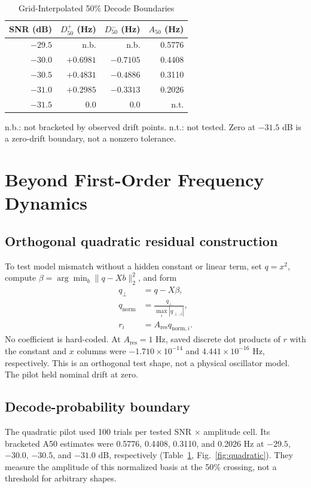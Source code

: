 \documentclass[conference]{IEEEtran}
\begin{document}
\begin{table}[t]
\caption{Grid-Interpolated 50\% Decode Boundaries}
\label{tab:boundaries}
\centering\footnotesize
\begin{tabular}{rrrr}
\toprule
SNR (dB) & $D_{50}^{+}$ (Hz) & $D_{50}^{-}$ (Hz) & $A_{50}$ (Hz) \\
\midrule
$-29.5$ & n.b. & n.b. & 0.5776 \\
$-30.0$ & $+0.6981$ & $-0.7105$ & 0.4408 \\
$-30.5$ & $+0.4831$ & $-0.4886$ & 0.3110 \\
$-31.0$ & $+0.2985$ & $-0.3313$ & 0.2026 \\
$-31.5$ & 0.0 & 0.0 & n.t. \\
\bottomrule
\end{tabular}
\vspace{2pt}
\parbox{\columnwidth}{\footnotesize n.b.: not bracketed by observed drift points. n.t.: not tested. Zero at $-31.5$ dB is a zero-drift boundary, not a nonzero tolerance.}
\end{table}

\section{Beyond First-Order Frequency Dynamics}
\subsection{Orthogonal quadratic residual construction}
To test model mismatch without a hidden constant or linear term, set $q=x^2$, compute $\beta=\arg\min_b\|q-Xb\|_2^2$, and form
\begin{equation}
\begin{aligned}
q_{\perp}&=q-X\beta,\\
q_{\mathrm{norm}}&=\frac{q_{\perp}}{\max_i|q_{\perp,i}|},\\
r_i&=A_{\mathrm{res}}q_{\mathrm{norm},i}.
\end{aligned}
\label{eq:quadratic}
\end{equation}
No coefficient is hard-coded. At $A_{\mathrm{res}}=1$ Hz, saved discrete dot products of $r$ with the constant and $x$ columns were $-1.710\times10^{-14}$ and $4.441\times10^{-16}$ Hz, respectively. This is an orthogonal test shape, not a physical oscillator model. The pilot held nominal drift at zero.

\subsection{Decode-probability boundary}
The quadratic pilot used 100 trials per tested SNR $\times$ amplitude cell. Its bracketed A50 estimates were 0.5776, 0.4408, 0.3110, and 0.2026 Hz at $-29.5$, $-30.0$, $-30.5$, and $-31.0$ dB, respectively (Table~\ref{tab:boundaries}, Fig.~\ref{fig:quadratic}). They measure the amplitude of this normalized basis at the 50\% crossing, not a threshold for arbitrary shapes.
\end{document}
